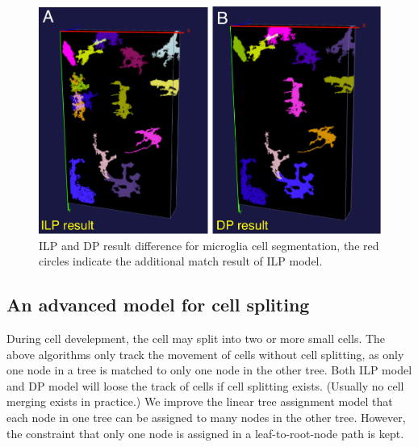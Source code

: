 \begin{figure}[htbp]
\centering
\includegraphics[width=1.0\textwidth]{images/treeassign_threepoint2}
\caption[ILP and DP result difference for microglia cell segmentation]{ILP and DP result difference for microglia cell segmentation, the red circles indicate the additional match result of ILP model.}
\label{fig:treeassign-threepoint2}
\end{figure}

\subsection{An advanced model for cell spliting}
During cell develepment, the cell may split into two or more small cells. The above algorithms only track the movement of cells without cell splitting, as only one node in a tree is matched to only one node in the other tree. Both ILP model and DP model will loose the track of cells if cell splitting exists. (Usually no cell merging exists in practice.) We improve the linear tree assignment model that each node in one tree can be assigned to many nodes in the other tree. However, the constraint that only one node is assigned in a leaf-to-root-node path is kept. 

